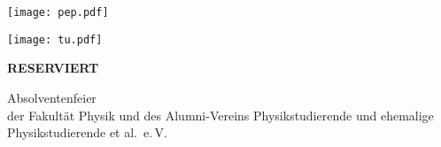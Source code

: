 \documentclass[paper=landscape]{scrartcl}
\begin{document}
\begin{minipage}{0.5\textwidth}%
  \texttt{[image: pep.pdf]}
\end{minipage}%
\begin{minipage}{0.5\textwidth}%
  \raggedleft%
  \texttt{[image: tu.pdf]}
\end{minipage}%

\vspace{3cm}

\begin{center}
  \fontsize{120}{140}\selectfont\bfseries%
  RESERVIERT
\end{center}

\vfill

\begin{center}
  \huge Absolventenfeier\\
  der Fakultät Physik und des Alumni-Vereins
  Physikstudierende und ehemalige Physikstudierende et al.\ e.\,V.
\end{center}
  
\end{document}
